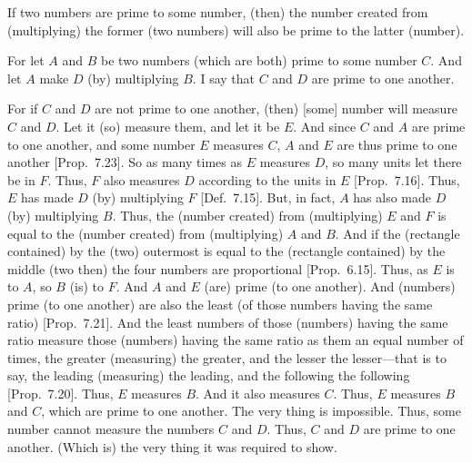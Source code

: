 \begin{Parallel}{}{}
{If two numbers are prime to some number, (then)
the number created from (multiplying) the former (two numbers) will also be prime to
the latter (number).

\epsfysize=2in
\centerline{}

For let $A$ and $B$ be two numbers (which are both) prime to some number $C$. And let $A$ make
$D$ (by) multiplying $B$. I say that $C$ and $D$ are prime to one another.

For if $C$ and $D$ are not prime to one another, (then) [some] number will
measure $C$ and $D$. Let it (so) measure them, and let it be $E$. And since
$C$ and $A$ are prime to one another, and some number $E$ measures $C$, $A$ and $E$
are thus prime to one another  [Prop.~7.23].
So as many times as $E$ measures $D$, so many units let there be in $F$.
Thus, $F$ also measures $D$ according to the units in $E$ [Prop.~7.16]. Thus, $E$ has made $D$ (by) multiplying
$F$ [Def.~7.15]. But, in fact, $A$ has also made
$D$ (by) multiplying $B$.
 Thus, the (number created) from (multiplying) $E$ and $F$ is equal to the  (number created) from (multiplying) $A$ and $B$. And if the (rectangle contained) by the (two)
outermost is equal to the (rectangle contained) by the middle (two then) the
four numbers are proportional [Prop.~6.15].
Thus, as $E$ is to $A$, so $B$  (is) to $F$. And $A$ and $E$ (are) prime (to one another).
And (numbers) prime (to one another) are also the least (of those numbers having the same ratio)
[Prop.~7.21]. And the least numbers of those
(numbers) having the same ratio  measure those (numbers)
having the same ratio as them an equal number of times,
the greater (measuring) the greater, and the lesser the lesser---that is
to say, the leading (measuring) the leading, and the following the
following [Prop.~7.20]. Thus, $E$
measures $B$.  And it also measures $C$. Thus, $E$ measures $B$ and $C$, which
are prime to one another. The very thing is impossible. Thus, some
number cannot measure the numbers $C$ and $D$. Thus, $C$ and
$D$ are prime to one another. (Which is) the very thing it was required
to show.}
\end{Parallel}

